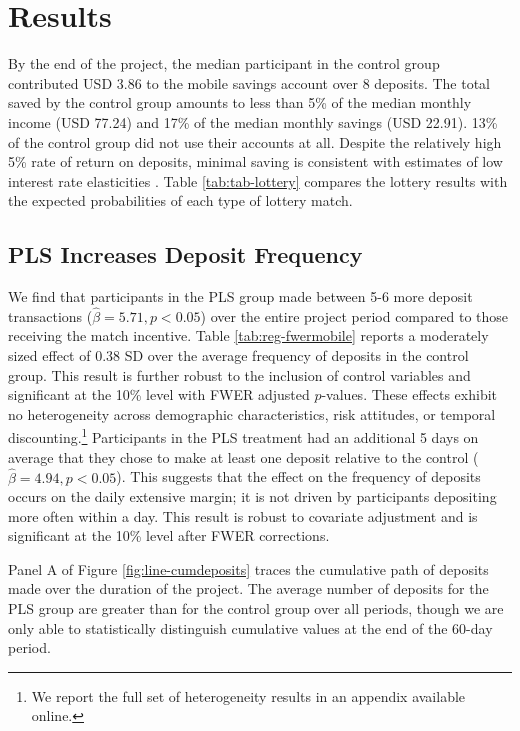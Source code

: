 \documentclass[11pt]{article}
\begin{document}
\section{Results} \label{sec:results}

	By the end of the project, the median participant in the control group contributed USD 3.86 to the mobile savings account over 8 deposits. The total saved by the control group amounts to less than 5\% of the median monthly income (USD 77.24) and 17\% of the median monthly savings (USD 22.91). 13\% of the control group did not use their accounts at all. Despite the relatively high 5\% rate of return on deposits, minimal saving is consistent with estimates of low interest rate elasticities \parencite{karlan_price_2018}. Table \ref{tab:tab-lottery} compares the lottery results with the expected probabilities of each type of lottery match.

	

	\subsection{PLS Increases Deposit Frequency}

		We find that participants in the PLS group made between 5-6 more deposit transactions ($\hat \beta = 5.71, p < 0.05$) over the entire project period compared to those receiving the match incentive. Table \ref{tab:reg-fwermobile} reports a moderately sized effect of 0.38 SD over the average frequency of deposits in the control group. This result is further robust to the inclusion of control variables and significant at the 10\% level with FWER adjusted $p$-values. These effects exhibit no heterogeneity across demographic characteristics, risk attitudes, or temporal discounting.\footnote{We report the full set of heterogeneity results in an appendix available online.} Participants in the PLS treatment had an additional 5 days on average that they chose to make at least one deposit relative to the control ($\hat \beta = 4.94, p < 0.05$). This suggests that the effect on the frequency of deposits occurs on the daily extensive margin; it is not driven by participants depositing more often within a day. This result is robust to covariate adjustment and is significant at the 10\% level after FWER corrections.

		

		Panel A of Figure \ref{fig:line-cumdeposits} traces the cumulative path of deposits made over the duration of the project. The average number of deposits for the PLS group are greater than for the control group over all periods, though we are only able to statistically distinguish cumulative values at the end of the 60-day period.
\end{document}
